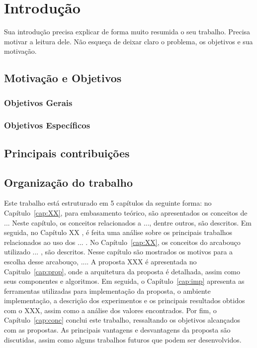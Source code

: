\chapter{Introdução} \label{cap:int}

Sua introdução precisa explicar de forma muito resumida o seu trabalho. Precisa motivar a leitura dele. Não esqueça de deixar claro o problema, os objetivos e sua motivação.


\section{Motivação e Objetivos}\label{sec:1_inicio}


\subsection{Objetivos Gerais}


\subsection{Objetivos Específicos}


\section{Principais contribuições}


\section{Organização do trabalho}\label{sec:1_org}

Este trabalho está estruturado em 5 capítulos da seguinte forma: no Capítulo~\ref{cap:XX}, para embasamento teórico, são apresentados os conceitos de ... Neste capítulo, os conceitos relacionados a ..., dentre outros, são descritos. Em seguida, no Capítulo XX , é feita uma análise sobre os principais trabalhos relacionados ao uso dos ... . No Capítulo~\ref{cap:XX}, os conceitos do arcabouço utilizado ... , são descritos. Nesse capítulo são mostrados os motivos para a escolha desse arcabouço, .... A proposta XXX é apresentada no Capitulo~\ref{cap:prop}, onde a arquitetura da proposta é detalhada, assim como seus componentes e algoritmos. Em seguida, o Capítulo~\ref{cap:imp} apresenta as ferramentas utilizadas para implementação da proposta, o ambiente implementação, a descrição dos experimentos e os principais resultados obtidos com o XXX, assim como a análise dos valores encontrados. Por fim, o Capítulo~\ref{cap:conc} conclui este trabalho, ressaltando os objetivos alcançados com as propostas. As principais vantagens e desvantagens da proposta são discutidas, assim como alguns trabalhos futuros que podem ser desenvolvidos. 
